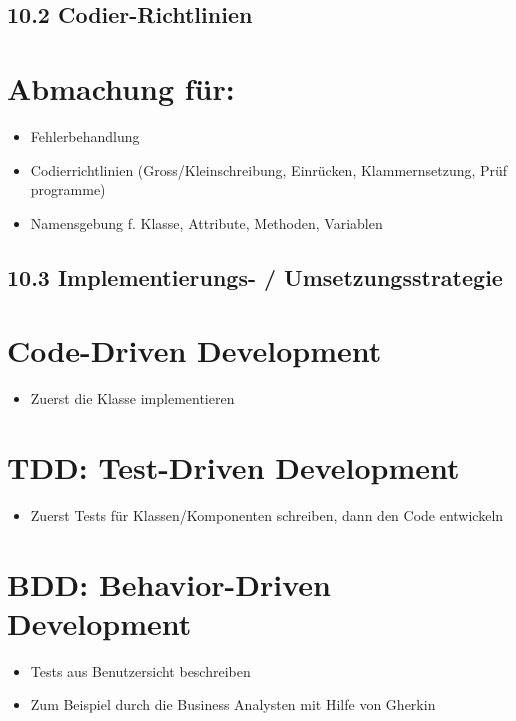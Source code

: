 \documentclass[10pt]{article}
\begin{document}
\subsection*{10.2 Codier-Richtlinien}
\section*{Abmachung für:}
\begin{itemize}
  \item Fehlerbehandlung
  \item Codierrichtlinien (Gross/Kleinschreibung, Einrücken, Klammernsetzung, Prüf programme)
  \item Namensgebung f. Klasse, Attribute, Methoden, Variablen
\end{itemize}

\subsection*{10.3 Implementierungs- / Umsetzungsstrategie}
\section*{Code-Driven Development}
\begin{itemize}
  \item Zuerst die Klasse implementieren
\end{itemize}

\section*{TDD: Test-Driven Development}
\begin{itemize}
  \item Zuerst Tests für Klassen/Komponenten schreiben, dann den Code entwickeln
\end{itemize}

\section*{BDD: Behavior-Driven Development}
\begin{itemize}
  \item Tests aus Benutzersicht beschreiben
  \item Zum Beispiel durch die Business Analysten mit Hilfe von Gherkin
\end{itemize}
\end{document}
